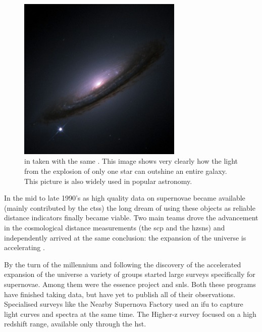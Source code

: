 \begin{figure}[htbp] %
   \centering
   \includegraphics[width=0.7\textwidth]{chapter_intro/plots/sn1994d.jpg} 
   \caption[HST image of SN 1994D]{ in  taken with the same . This image shows very clearly how the light from the explosion of only one star can outshine an entire galaxy. This picture is also widely used in popular astronomy.}
   \label{fig:sn1994d}
\end{figure}

In the mid to late 1990's as high quality data on supernovae became available (mainly contributed by the \gls{ctss}) the long dream \citep[e.g.][]{1938ApJ....88..285B, 1960ZA.....49..201V, 1968AJ.....73.1021K} of using these objects as reliable distance indicators finally became viable. Two main teams drove the advancement in the cosmological distance measurements (the \gls{scp} and the \gls{hzsns}) and independently arrived at the same conclusion: the expansion of the universe is accelerating \citep{1998AJ....116.1009R,1999ApJ...517..565P}.

By the turn of the millennium and following the discovery of the accelerated expansion of the universe a variety of groups started large surveys specifically for supernovae. Among them were the \gls{essence} project and \gls{snls}. Both these programs have finished taking data, but have yet to publish all of their observations. Specialised surveys like the Nearby Supernova Factory \citep{2002SPIE.4836...61A} used an \gls{ifu} to capture light curves and spectra at the same time. The Higher-z survey \citep{2004ApJ...613..200S} focused on a high redshift range, available only through the \gls{hst}.

